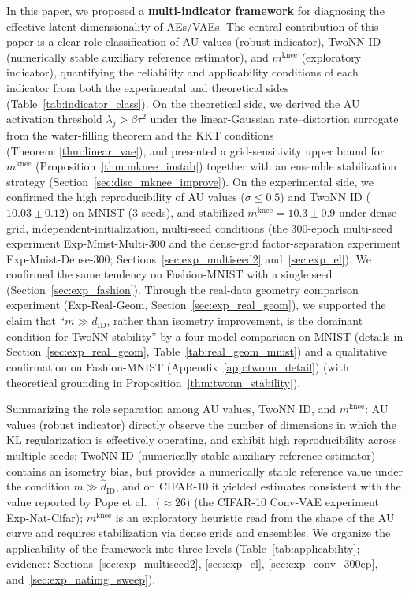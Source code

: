 \documentclass[make,article,submit,pdftex,moreauthors]{Definitions/mdpi}
\newcommand{\mknee}{m^{\mathrm{knee}}}
\begin{document}
In this paper, we proposed a \textbf{multi-indicator framework} for diagnosing
the effective latent dimensionality of AEs/VAEs.
The central contribution of this paper is a clear role classification of AU
values (robust indicator), TwoNN ID (numerically stable auxiliary reference
estimator), and $\mknee$ (exploratory indicator), quantifying the reliability
and applicability conditions of each indicator from both the experimental and
theoretical sides (Table~\ref{tab:indicator_class}).
On the theoretical side, we derived the AU activation threshold
$\lambda_j > \beta\tau^2$ under the linear-Gaussian rate--distortion surrogate
from the water-filling theorem and the KKT conditions
(Theorem~\ref{thm:linear_vae}), and presented a grid-sensitivity upper bound
for $\mknee$ (Proposition~\ref{thm:mknee_instab}) together with an ensemble
stabilization strategy (Section~\ref{sec:disc_mknee_improve}).
On the experimental side, we confirmed the high reproducibility of AU values
($\sigma \leq 0.5$) and TwoNN ID ($10.03 \pm 0.12$) on MNIST (3 seeds), and
stabilized $\mknee = 10.3 \pm 0.9$ under dense-grid,
independent-initialization, multi-seed conditions
(the 300-epoch multi-seed experiment Exp-Mnist-Multi-300 and the dense-grid
factor-separation experiment Exp-Mnist-Dense-300;
Sections~\ref{sec:exp_multiseed2} and~\ref{sec:exp_el}).
We confirmed the same tendency on Fashion-MNIST with a single seed
(Section~\ref{sec:exp_fashion}).
Through the real-data geometry comparison experiment
(Exp-Real-Geom, Section~\ref{sec:exp_real_geom}), we supported the claim that
``$m \gg \hat{d}_\mathrm{ID}$, rather than isometry improvement, is the
dominant condition for TwoNN stability'' by a four-model comparison on MNIST
(details in Section~\ref{sec:exp_real_geom}, Table~\ref{tab:real_geom_mnist})
and a qualitative confirmation on Fashion-MNIST
(Appendix~\ref{app:twonn_detail})
(with theoretical grounding in Proposition~\ref{thm:twonn_stability}).

Summarizing the role separation among AU values, TwoNN ID, and $\mknee$:
AU values (robust indicator) directly observe the number of dimensions in
which the KL regularization is effectively operating, and exhibit high
reproducibility across multiple seeds;
TwoNN ID (numerically stable auxiliary reference estimator) contains an
isometry bias, but provides a numerically stable reference value under the
condition $m \gg \hat{d}_\mathrm{ID}$, and on CIFAR-10 it yielded estimates
consistent with the value reported by Pope et al.~\cite{pope2021intrinsic}
($\approx 26$) (the CIFAR-10 Conv-VAE experiment Exp-Nat-Cifar);
$\mknee$ is an exploratory heuristic read from the shape of the AU curve and
requires stabilization via dense grids and ensembles.
We organize the applicability of the framework into three levels
(Table~\ref{tab:applicability};
evidence: Sections~\ref{sec:exp_multiseed2}, \ref{sec:exp_el},
\ref{sec:exp_conv_300ep}, and~\ref{sec:exp_natimg_sweep}).
\end{document}
